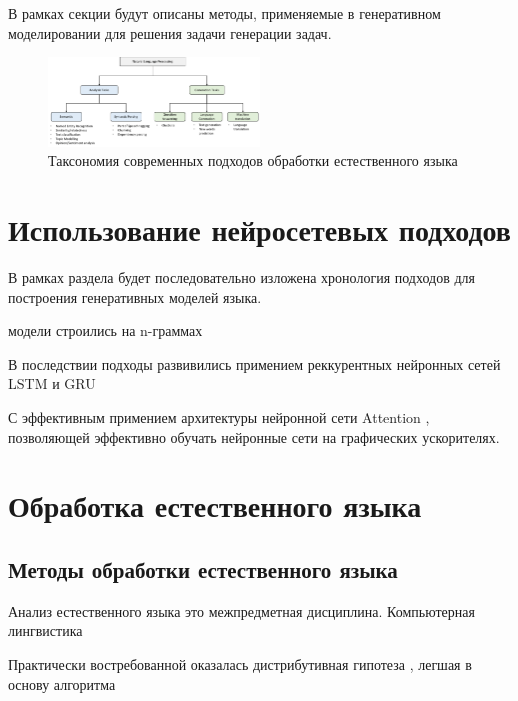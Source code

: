 В рамках секции будут описаны методы, применяемые в генеративном моделировании
для решения задачи генерации задач.


\begin{figure}[h]
    \centering
    \includegraphics[width=0.5\textwidth]{assets/llm/taxonomy.png}
    \caption{Таксономия современных подходов обработки естественного языка}
    \label{llm_taxonomy}
\end{figure}




\section{Использование нейросетевых подходов}

В рамках раздела будет последовательно изложена хронология подходов
для построения генеративных моделей языка.

 модели строились на n-граммах \cite{heafield-2011-kenlm}
 


В последствии подходы развивились примением реккурентных нейронных сетей LSTM \cite{HochSchm97} и GRU



С эффективным примением архитектуры нейронной сети Attention \cite{NIPS2017_3f5ee243}, позволяющей эффективно обучать нейронные сети на графических ускорителях. 




\section{Обработка естественного языка}

\subsection{Методы обработки естественного языка}

Анализ естественного языка это межпредметная дисциплина.
Компьютерная лингвистика

Практически востребованной оказалась дистрибутивная гипотеза \cite{Schutze},
легшая в основу алгоритма \cite{NIPS2013_9aa42b31}


